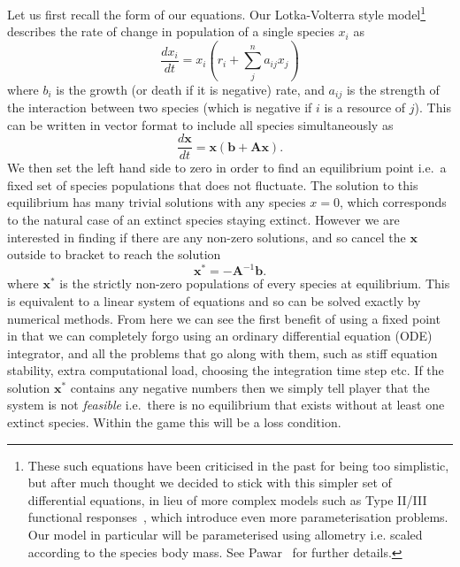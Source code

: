 Let us first recall the form of our equations. Our Lotka-Volterra style model\footnote{These such equations have been criticised in the past for being too simplistic, but after much thought we decided to stick with this simpler set of differential equations, in lieu of more complex models such as Type II/III functional responses~\cite{holling}, which introduce even more parameterisation problems. Our model in particular will be parameterised using allometry i.e. scaled according to the species body mass. See Pawar~\cite{pawar} for further details.}
describes the rate of change in population of a single species $x_i$ as
\begin{equation}
  \frac{dx_i}{dt} = x_i(r_i + \sum_j^na_{ij}x_j)
  \label{lv}
\end{equation}
where $b_i$ is the growth (or death if it is negative) rate, and $a_{ij}$ is the strength of the interaction between two species (which is negative if $i$ is a resource of $j$). 
This can be written in vector format to include all species simultaneously as
\begin{equation}
    \frac{d\mathbf{x}}{dt} = \mathbf{x}(\mathbf{b} + \mathbf{Ax}).
    \label{interaction matrix}
\end{equation}
We then set the left hand side to zero in order to find an equilibrium point i.e.\ a fixed set of species populations that does not fluctuate.
The solution to this equilibrium has many trivial solutions with any species $x=0$, which corresponds to the natural case of an extinct species staying extinct.
However we are interested in finding if there are any non-zero solutions, and so cancel the $\mathbf{x}$ outside to bracket to reach the solution
\begin{equation}
  \mathbf{x^*} = -\mathbf{A}^{-1}\mathbf{b}.
  \label{equilibrium}
\end{equation}
where $\mathbf{x}^*$ is the strictly non-zero populations of every species at equilibrium.
This is equivalent to a linear system of equations and so can be solved exactly by numerical methods.
From here we can see the first benefit of using a fixed point in that we can completely forgo using an ordinary differential equation (ODE) integrator, and all the problems that go along with them, such as stiff equation stability, extra computational load, choosing the integration time step etc.
If the solution $\mathbf{x^*}$ contains any negative numbers then we simply tell player that the system is not \emph{feasible} i.e.\ there is no equilibrium that exists without at least one extinct species. Within the game this will be a loss condition.

